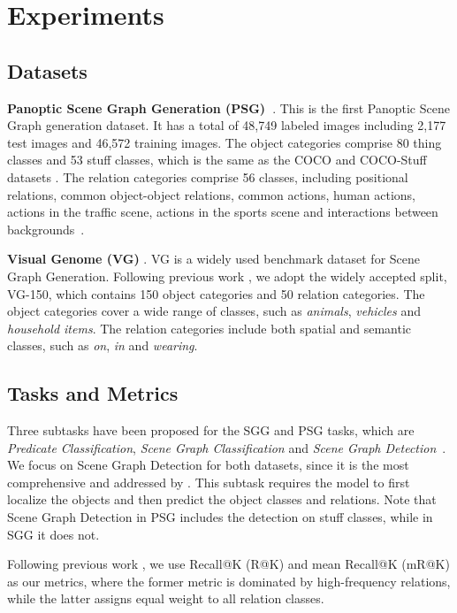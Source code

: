 \section{Experiments}

\subsection{Datasets}

\noindent \textbf{Panoptic Scene Graph Generation (PSG)~\citep{yang2022panoptic}}.
This is the first Panoptic Scene Graph generation dataset. It has a total of 48,749 labeled images including 2,177 test images and 46,572 training images.
The object categories comprise 80 thing classes and 53 stuff classes, which is the same as the COCO \citep{lin2014microsoft} and COCO-Stuff datasets \citep{caesar2018coco}.
The relation categories comprise 56 classes, including positional relations, common object-object relations, common actions, human actions, actions in the traffic scene, actions in the sports scene and interactions between backgrounds~\citep{yang2022panoptic}. 

\noindent \textbf{Visual Genome (VG)} \citep{krishna2017visual}.
VG is a widely used benchmark dataset for Scene Graph Generation.
Following previous work \citep{zellers2018neural, chen2019counterfactual}, we adopt the widely accepted split, VG-150, which contains 150 object categories and 50 relation categories.
The object categories cover a wide range of classes, such as \textit{animals}, \textit{vehicles} and \textit{household items}.
The relation categories include both spatial and semantic classes, such as \textit{on}, \textit{in} and \textit{wearing}.

\subsection{Tasks and Metrics}
Three subtasks have been proposed for the SGG and PSG tasks, which are \emph{Predicate Classification}, \emph{Scene Graph Classification} and \emph{Scene Graph Detection}~\citep{xu2017scene}.
We focus on Scene Graph Detection for both datasets, since it is the most comprehensive and addressed by \citep{yang2022panoptic}. This subtask
requires the model to first localize the objects and then predict the object classes and relations.
Note that Scene Graph Detection in PSG includes the detection on stuff classes, while in SGG it does not.

Following previous work \citep{tang2019learning, yu2020cogtree, yang2022panoptic}, we use Recall@K (R@K) and mean Recall@K (mR@K) as our metrics, where the former metric is dominated by high-frequency relations, while the latter assigns equal weight to all relation classes.

